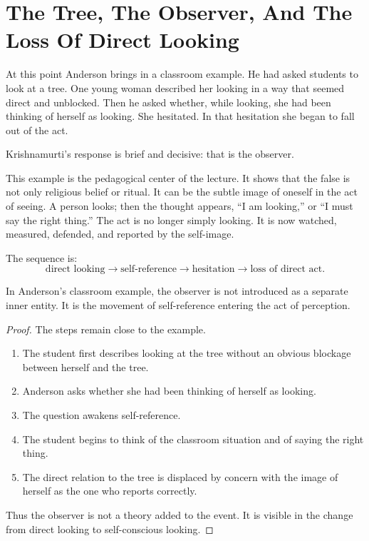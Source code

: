 \section{The Tree, The Observer, And The Loss Of Direct Looking}

At this point Anderson brings in a classroom example. He had asked students to look at a tree. One young woman described her looking in a way that seemed direct and unblocked. Then he asked whether, while looking, she had been thinking of herself as looking. She hesitated. In that hesitation she began to fall out of the act.

Krishnamurti's response is brief and decisive: that is the observer.

This example is the pedagogical center of the lecture. It shows that the false is not only religious belief or ritual. It can be the subtle image of oneself in the act of seeing. A person looks; then the thought appears, ``I am looking,'' or ``I must say the right thing.'' The act is no longer simply looking. It is now watched, measured, defended, and reported by the self-image.

The sequence is:
\begin{equation}
\text{direct looking}
\longrightarrow
\text{self-reference}
\longrightarrow
\text{hesitation}
\longrightarrow
\text{loss of direct act}.
\end{equation}

\begin{proposition}
In Anderson's classroom example, the observer is not introduced as a separate inner entity. It is the movement of self-reference entering the act of perception.
\end{proposition}

\begin{proof}
The steps remain close to the example.
\begin{enumerate}
\item The student first describes looking at the tree without an obvious blockage between herself and the tree.
\item Anderson asks whether she had been thinking of herself as looking.
\item The question awakens self-reference.
\item The student begins to think of the classroom situation and of saying the right thing.
\item The direct relation to the tree is displaced by concern with the image of herself as the one who reports correctly.
\end{enumerate}
Thus the observer is not a theory added to the event. It is visible in the change from direct looking to self-conscious looking.
\end{proof}

